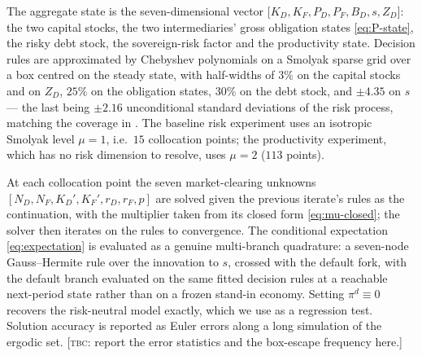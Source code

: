 The aggregate state is the seven-dimensional vector
$\bigl[K_D,K_F,P_D,P_F,B_D,s,Z_D\bigr]$: the two capital stocks, the two
intermediaries' gross obligation states \eqref{eq:P-state}, the risky debt stock,
the sovereign-risk factor and the productivity state. Decision rules are
approximated by Chebyshev polynomials on a Smolyak sparse grid over a box centred
on the steady state, with half-widths of $3\%$ on the capital stocks and on
$Z_D$, $25\%$ on the obligation states, $30\%$ on the debt stock, and $\pm4.35$
on $s$ --- the last being $\pm2.16$ unconditional standard deviations of the risk
process, matching the coverage in \citet{bocola2016pass}. The baseline risk
experiment uses an isotropic Smolyak level $\mu=1$, i.e.\ $15$ collocation
points; the productivity experiment, which has no risk dimension to resolve, uses
$\mu=2$ ($113$ points).

At each collocation point the seven market-clearing unknowns
$[N_D,N_F,K_D',K_F',r_D,r_F,p]$ are solved given the previous iterate's rules as
the continuation, with the multiplier taken from its closed form
\eqref{eq:mu-closed}; the solver then iterates on the rules to convergence. The
conditional expectation \eqref{eq:expectation} is evaluated as a genuine
multi-branch quadrature: a seven-node Gauss--Hermite rule over the innovation to
$s$, crossed with the default fork, with the default branch evaluated on the same
fitted decision rules at a reachable next-period state rather than on a frozen
stand-in economy. Setting $\pi^{d}\equiv0$ recovers the risk-neutral model
exactly, which we use as a regression test. Solution accuracy is reported as
Euler errors along a long simulation of the ergodic set. [\textsc{tbc}: report the
error statistics and the box-escape frequency here.]
